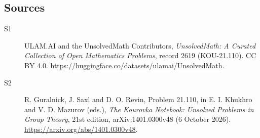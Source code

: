 \documentclass[11pt]{article}
\begin{document}
\subsection{Sources}
\begin{description}
\item[\hypertarget{source:2619:1}{S1}] ULAM.AI and the UnsolvedMath Contributors, \emph{UnsolvedMath: A Curated Collection of Open Mathematics Problems}, record 2619 (KOU-21.110). CC BY 4.0. \url{https://huggingface.co/datasets/ulamai/UnsolvedMath}.
\item[\hypertarget{source:2619:2}{S2}] R. Guralnick, J. Saxl and D. O. Revin, Problem 21.110, in E. I. Khukhro and V. D. Mazurov (eds.), \emph{The Kourovka Notebook: Unsolved Problems in Group Theory}, 21st edition, arXiv:1401.0300v48 (6 October 2026). \url{https://arxiv.org/abs/1401.0300v48}.
\end{description}
\label{end:2619}
\end{document}

